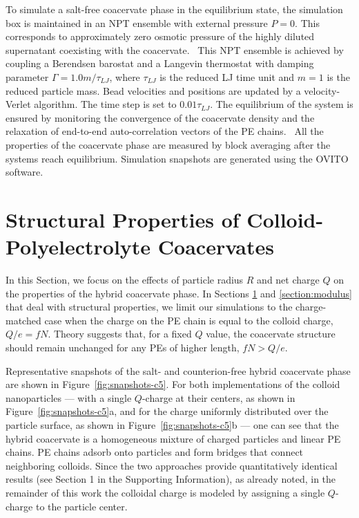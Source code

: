 \documentclass[journal=mamobx, manuscript=article]{achemso}
\begin{document}
To simulate a salt-free coacervate phase in the equilibrium state, the simulation box is maintained in an NPT ensemble with external pressure $P = 0$. This corresponds to approximately zero osmotic pressure of the highly diluted supernatant coexisting with the coacervate.~\cite{rubinstein2018structure,yu2020crossover} This NPT ensemble is achieved by coupling a Berendsen barostat and a Langevin thermostat with damping parameter $\Gamma = 1.0m/\tau_{LJ}$, where $\tau_{LJ}$ is the reduced LJ time unit and $m = 1$ is the reduced particle mass. Bead velocities and positions are updated by a velocity-Verlet algorithm. The time step is set to $0.01\tau_{LJ}$. The equilibrium of the system is ensured by monitoring the convergence of the coacervate density and the relaxation of end-to-end auto-correlation vectors of the PE chains.~\cite{yu2020crossover} All the properties of the coacervate phase are measured by block averaging after the systems reach equilibrium. Simulation snapshots are generated using the OVITO software.~\cite{ovito}



\section{Structural Properties of Colloid-Polyelectrolyte Coacervates}
\label{section:structure}

In this Section, we focus on the effects of particle radius $R$ and net charge $Q$ on the properties of the hybrid coacervate phase. In Sections \ref{section:structure} and \ref{section:modulus} that deal with structural properties, we limit our simulations to the charge-matched case when the charge on the PE chain is equal to the colloid charge, $Q/e = fN$. Theory suggests that, for a fixed $Q$ value, the coacervate structure should remain unchanged for any PEs of higher length, $fN > Q/e$.~\cite{artem2022hybrid} 

Representative snapshots of the salt- and counterion-free hybrid coacervate phase are shown in Figure~\ref{fig:snapshots-c5}. For both implementations of the colloid nanoparticles --- with a single $Q$-charge at their centers, as shown in Figure~\ref{fig:snapshots-c5}a, and for the charge uniformly distributed over the particle surface, as shown in Figure~\ref{fig:snapshots-c5}b --- one can see that the hybrid coacervate is a homogeneous mixture of charged particles and linear PE chains. PE chains adsorb onto particles and form bridges that connect neighboring colloids. Since the two approaches provide quantitatively identical results (see Section 1 in the Supporting Information), as already noted,
in the remainder of this work the colloidal charge is modeled by assigning a single $Q$-charge to the particle center. 
\end{document}
